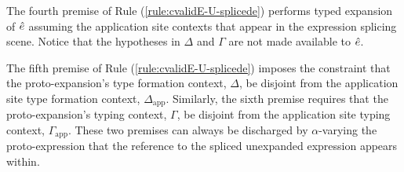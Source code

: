 The fourth premise of Rule (\ref{rule:cvalidE-U-splicede}) performs typed expansion of ${\hat e}$ assuming the application site contexts that appear in the expression splicing scene. Notice that the hypotheses in $\Delta$ and $\Gamma$ are not made available to ${\hat e}$. 

The fifth premise of Rule (\ref{rule:cvalidE-U-splicede}) imposes the constraint that the proto-expansion's type formation context, $\Delta$, be disjoint from the application site type formation context, $\Delta_\text{app}$. Similarly, the sixth premise requires that the proto-expansion's typing context, $\Gamma$, be disjoint from the application site typing context, $\Gamma_\text{app}$. These two premises can always be discharged by $\alpha$-varying the proto-expression that the reference to the spliced unexpanded expression appears within. 

